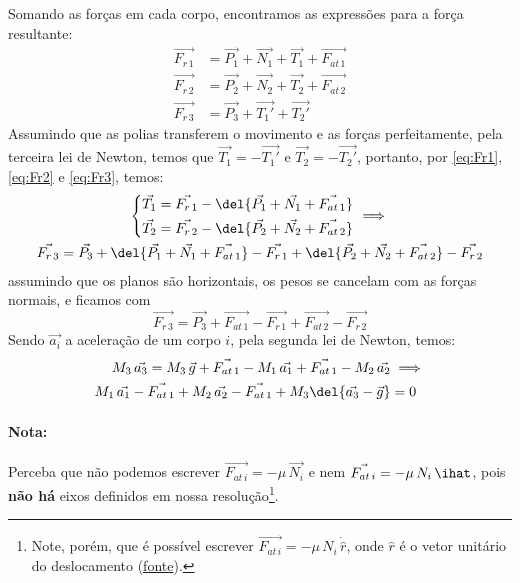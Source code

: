 \documentclass[]{IMTexam}
\begin{document}
\begin{questions}
\begin{parts}
		\begin{solution}
			Somando as forças em cada corpo, encontramos as expressões para a força resultante:
			\begin{align}
				\vec{F_{r\,1}} & =\vec{P_{1}}+\vec{N_1}+\vec{T_1}+\vec{F_{at\,1}}\label{eq:Fr1} \\
				\vec{F_{r\,2}} & =\vec{P_{2}}+\vec{N_2}+\vec{T_2}+\vec{F_{at\,2}}\label{eq:Fr2} \\
				\vec{F_{r\,3}} & =\vec{P_{3}}+\vec{T_1'}+\vec{T_2'}\label{eq:Fr3}
			\end{align}
			Assumindo que as polias transferem o movimento e as forças perfeitamente, pela terceira lei de Newton, temos que $ \vec{T_1}=-\vec{T_1'} $ e $ \vec{T_2}=-\vec{T_2'} $, portanto, por \ref{eq:Fr1}, \ref{eq:Fr2} e \ref{eq:Fr3}, temos:
			\begin{gather*}
				\left\lbrace
				\begin{aligned}
					\vec{T_1} & =\vec{F_{r\,1}}-\del{\vec{P_{1}}+\vec{N_1}+\vec{F_{at\,1}}}\nonumber \\
					\vec{T_2} & =\vec{F_{r\,2}}-\del{\vec{P_{2}}+\vec{N_2}+\vec{F_{at\,2}}}
				\end{aligned}\right. \implies\nonumber\\
				\vec{F_{r\,3}}=\vec{P_{3}}+\del{\vec{P_{1}}+\vec{N_1}+\vec{F_{at\,1}}}-\vec{F_{r\,1}}+\del{\vec{P_{2}}+\vec{N_2}+\vec{F_{at\,2}}}-\vec{F_{r\,2}}
			\end{gather*}
			assumindo que os planos são horizontais, os pesos se cancelam com as forças normais, e ficamos com
			\[ \vec{F_{r\,3}}=\vec{P_{3}}+\vec{F_{at\,1}}-\vec{F_{r\,1}}+\vec{F_{at\,2}}-\vec{F_{r\,2}} \]
			Sendo $ \vec{a_i} $ a aceleração de um corpo $ i $, pela segunda lei de Newton, temos:
			\begin{equation}\label{eq:Fr3rep}
				\begin{aligned}
					M_3\,\vec{a_3}=M_3\,\vec{g}+\vec{F_{at\,1}}-M_1\,\vec{a_1}+\vec{F_{at\,1}}-M_2\,\vec{a_2} & \implies \\
					M_1\,\vec{a_1}-\vec{F_{at\,1}}+M_2\,\vec{a_2}-\vec{F_{at\,1}}+M_3\del{\vec{a_3}-\vec{g}}  & =0
				\end{aligned}
			\end{equation}

			\paragraph{Nota:}
			Perceba que não podemos escrever $\vec{F_{at\,i}}=-\mu\,\vec{N_i}$ e nem $\vec{F_{at\,i}}=-\mu\,N_i\,\ihat$, pois \textbf{não há} eixos definidos em nossa resolução\footnote{Note, porém, que é possível escrever $ \vec{F_{at\,i}}=-\mu\,N_i\,\dot{\hat{r}} $, onde $ \hat{r} $ é o vetor unitário do deslocamento (\href{https://physics.stackexchange.com/questions/77458/about-vector-form-of-friction}{fonte}).}.
		\end{solution}


\end{parts}
\end{questions}
\end{document}
